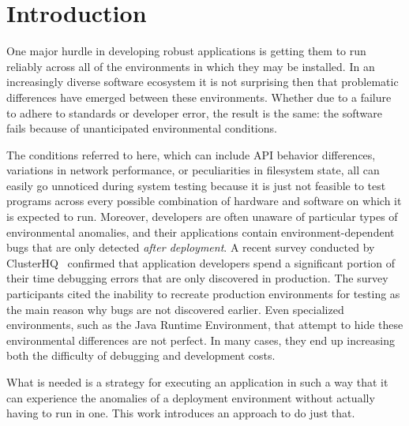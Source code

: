 \section{Introduction}

One major hurdle in developing robust applications is getting them to
run reliably across all of the environments in which they may be
installed.  In an increasingly diverse software ecosystem it is not
surprising then that problematic differences have emerged between these
environments.  Whether due to a failure to adhere to 
standards or developer error, the result is the same: the software 
fails because of unanticipated environmental conditions.

The conditions referred to here, which can include API behavior
differences, variations in network performance, or peculiarities in
filesystem state, all
can easily go unnoticed
during system testing because it is just not feasible to
test programs 
across every possible combination of hardware and software on which it
is expected to run. Moreover, developers are often unaware
of particular types of environmental anomalies, and their
applications contain environment-dependent bugs that are only
detected \emph{after deployment}. A recent survey conducted by
ClusterHQ~\cite{ClusterHQSurvey} confirmed that application developers
spend a significant portion of their time debugging errors that are only discovered
in production.  The survey participants cited the inability to
recreate production environments for testing as the main reason why
bugs are not discovered earlier.
Even specialized environments, such as the Java Runtime Environment, that
attempt to hide these environmental differences are not perfect.
In many cases, they end up increasing both the difficulty of debugging and
development costs.

What is needed is a strategy for executing an application in such a way that
it can experience the anomalies of a deployment
environment without actually having to run in one.  This work
introduces an approach to do just that.

